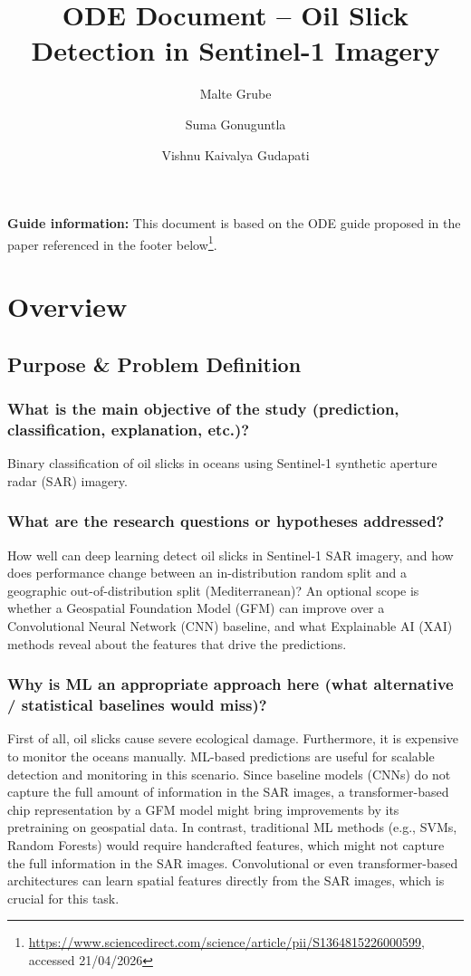 \documentclass[sigconf]{acmart}
\title{ODE Document -- Oil Slick Detection in Sentinel-1 Imagery}
\author{Malte Grube}
\affiliation{
  \institution{University of Rostock}
  \city{Rostock}
  \country{Germany}
}
\author{Suma Gonuguntla}
\affiliation{
  \institution{University of Rostock}
  \city{Rostock}
  \country{Germany}
}
\author{Vishnu Kaivalya Gudapati}
\affiliation{
  \institution{University of Rostock}
  \city{Rostock}
  \country{Germany}
}
\begin{document}
\maketitle

\renewcommand{\contentsname}{\textbf{Table of Contents}}
\localtableofcontents \vspace{1em}
\textbf{Guide information:} This document is based on the ODE guide proposed in the paper referenced in the footer below\footnote{\url{https://www.sciencedirect.com/science/article/pii/S1364815226000599}, accessed 21/04/2026}.

\section{Overview}

\subsection{Purpose \& Problem Definition}
\subsubsection{What is the main objective of the study (prediction, classification, explanation, etc.)?} Binary classification of oil slicks in oceans using Sentinel-1 synthetic aperture radar (SAR) imagery.
\subsubsection{What are the research questions or hypotheses addressed?} How well can deep learning detect oil slicks in Sentinel-1 SAR imagery, and how does performance change between an in-distribution random split and a geographic out-of-distribution split (Mediterranean)? An optional scope is whether a Geospatial Foundation Model (GFM) can improve over a Convolutional Neural Network (CNN) baseline, and what Explainable AI (XAI) methods reveal about the features that drive the predictions.
\subsubsection{Why is ML an appropriate approach here (what alternative / statistical baselines would miss)?} First of all, oil slicks cause severe ecological damage. Furthermore, it is expensive to monitor the oceans manually. ML-based predictions are useful for scalable detection and monitoring in this scenario. Since baseline models (CNNs) do not capture the full amount of information in the SAR images, a transformer-based chip representation by a GFM model might bring improvements by its pretraining on geospatial data. In contrast, traditional ML methods (e.g., SVMs, Random Forests) would require handcrafted features, which might not capture the full information in the SAR images. Convolutional or even transformer-based architectures can learn spatial features directly from the SAR images, which is crucial for this task.
\end{document}
